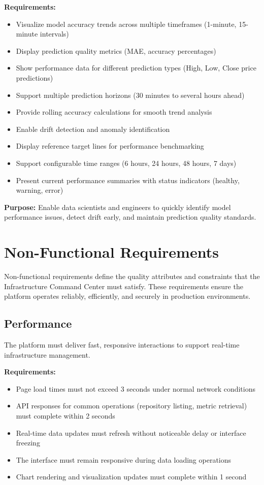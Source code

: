 \textbf{Requirements:}
\begin{itemize}
    \item Visualize model accuracy trends across multiple timeframes (1-minute, 15-minute intervals)
    \item Display prediction quality metrics (MAE, accuracy percentages)
    \item Show performance data for different prediction types (High, Low, Close price predictions)
    \item Support multiple prediction horizons (30 minutes to several hours ahead)
    \item Provide rolling accuracy calculations for smooth trend analysis
    \item Enable drift detection and anomaly identification
    \item Display reference target lines for performance benchmarking
    \item Support configurable time ranges (6 hours, 24 hours, 48 hours, 7 days)
    \item Present current performance summaries with status indicators (healthy, warning, error)
\end{itemize}

\textbf{Purpose:} Enable data scientists and engineers to quickly identify model performance issues, detect drift early, and maintain prediction quality standards.
\clearpage

\section{Non-Functional Requirements}
Non-functional requirements define the quality attributes and constraints that the Infrastructure Command Center must satisfy. These requirements ensure the platform operates reliably, efficiently, and securely in production environments.

\subsection{Performance}

The platform must deliver fast, responsive interactions to support real-time infrastructure management.

\textbf{Requirements:}
\begin{itemize}
    \item Page load times must not exceed 3 seconds under normal network conditions
    \item API responses for common operations (repository listing, metric retrieval) must complete within 2 seconds
    \item Real-time data updates must refresh without noticeable delay or interface freezing
    \item The interface must remain responsive during data loading operations
    \item Chart rendering and visualization updates must complete within 1 second
\end{itemize}

